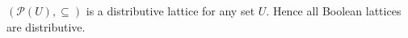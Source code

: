 $(\mathcal{P}(U), \subseteq)$ is a distributive lattice for any set $U$. Hence all Boolean lattices are distributive.
